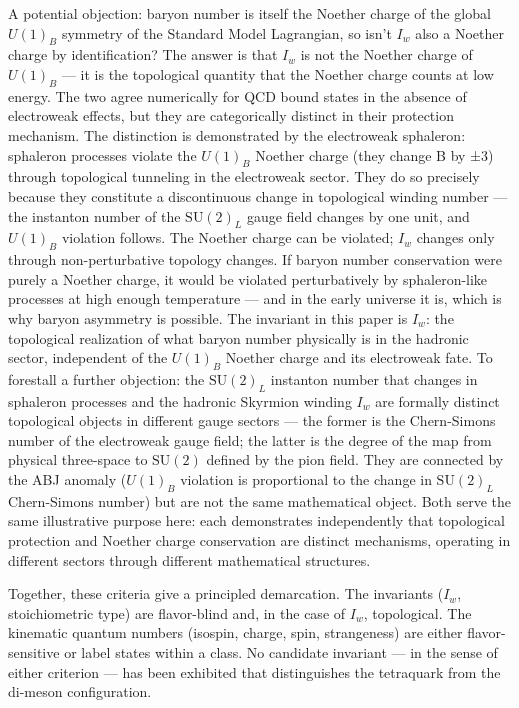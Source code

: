 A potential objection: baryon number is itself the Noether charge of the
global \(U(1)_B\) symmetry of the Standard Model Lagrangian, so isn't
\(I_w\) also a Noether charge by identification? The answer is that
\(I_w\) is not the Noether charge of \(U(1)_B\) --- it is the
topological quantity that the Noether charge counts at low energy. The
two agree numerically for QCD bound states in the absence of electroweak
effects, but they are categorically distinct in their protection
mechanism. The distinction is demonstrated by the electroweak sphaleron:
sphaleron processes violate the \(U(1)_B\) Noether charge (they change B
by ±3) through topological tunneling in the electroweak sector. They do
so precisely because they constitute a discontinuous change in
topological winding number --- the instanton number of the
\(\mathrm{SU}(2)_L\) gauge field changes by one unit, and \(U(1)_B\)
violation follows. The Noether charge can be violated; \(I_w\) changes
only through non-perturbative topology changes. If baryon number
conservation were purely a Noether charge, it would be violated
perturbatively by sphaleron-like processes at high enough temperature
--- and in the early universe it is, which is why baryon asymmetry is
possible. The invariant in this paper is \(I_w\): the
topological realization of what baryon number physically is in the
hadronic sector, independent of the \(U(1)_B\) Noether charge and its
electroweak fate. To forestall a further objection: the
\(\mathrm{SU}(2)_L\) instanton number that changes in sphaleron
processes and the hadronic Skyrmion winding \(I_w\) are formally
distinct topological objects in different gauge sectors --- the former
is the Chern-Simons number of the electroweak gauge field; the latter is
the degree of the map from physical three-space to \(\mathrm{SU}(2)\)
defined by the pion field. They are connected by the ABJ anomaly
(\(U(1)_B\) violation is proportional to the change in
\(\mathrm{SU}(2)_L\) Chern-Simons number) but are not the same
mathematical object. Both serve the same illustrative purpose here: each
demonstrates independently that topological protection and Noether
charge conservation are distinct mechanisms, operating in different
sectors through different mathematical structures.

Together, these criteria give a principled demarcation. The invariants (\(I_w\), stoichiometric type) are flavor-blind and, in the
case of \(I_w\), topological. The kinematic quantum numbers (isospin,
charge, spin, strangeness) are either flavor-sensitive or label states
within a class. No candidate invariant --- in the
sense of either criterion --- has been exhibited that distinguishes the
tetraquark from the di-meson configuration.

